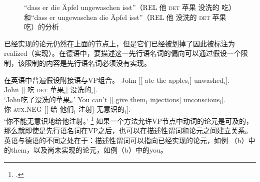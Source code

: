 \begin{figure}
\caption{“dass er die Äpfel ungewaschen isst”（REL 他 \textsc{det} 苹果 没洗的 吃）和“dass er ungewaschen die Äpfel isst”（REL 他 没洗的 \textsc{det} 苹果 吃）的分析}\label{anal-er-die-frau-nackt-sieht}
\end{figure}%
已经实现的论元仍然在上面的节点上，但是它们已经被划掉了因此被标注为realized（实现）。在德语中，要描述这一先行语名词的偏向可以通过假设一个限制，该限制的内容是先行语名词必须没有实现。

在英语中普遍假设附接语与VP组合。
\eal
\ex 
\gll John [[ ate the apples$_i$] unwashed$_i$].\\
	John [[ 吃 \textsc{det} 苹果$_i$] 没洗的$_i$].\\
\glt `John吃了没洗的苹果。'
\ex 
\gll You can't [[ give them$_i$ injections] unconscious$_i$].\\
	你 \textsc{aux}.NEG [[ 给 他们$_i$ 注射] 无意识的$_i$].\\
\glt `你不能无意识地给他注射。'
\footnote{
.
}
\zl
如果一个方法允许VP节点中动词的论元是可及的，那么就即使是先行语名词在VP之后，也可以在描述性谓词和论元之间建立关系。英语与德语的不同之处在于：描述性谓词可以指向已经实现的论元，如例 （b）中的them，以及尚未实现的论元，如例（b）中的you。

